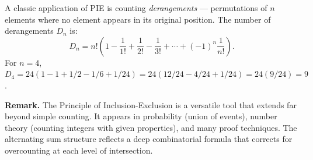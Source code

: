 \documentclass[11pt,a4paper]{article}
\begin{document}
\begin{example}
A classic application of PIE is counting \textit{derangements} — permutations of $n$ elements where no element appears in its original position. The number of derangements $D_n$ is:
\begin{equation*}
    D_n = n! \left(1 - \frac{1}{1!} + \frac{1}{2!} - \frac{1}{3!} + \cdots + (-1)^n \frac{1}{n!}\right).
\end{equation*}
For $n = 4$, $D_4 = 24(1 - 1 + 1/2 - 1/6 + 1/24) = 24(12/24 - 4/24 + 1/24) = 24(9/24) = 9$.
\end{example}

\textbf{Remark.} The Principle of Inclusion-Exclusion is a versatile tool that extends far beyond simple counting. It appears in probability (union of events), number theory (counting integers with given properties), and many proof techniques. The alternating sum structure reflects a deep combinatorial formula that corrects for overcounting at each level of intersection.
\end{document}

